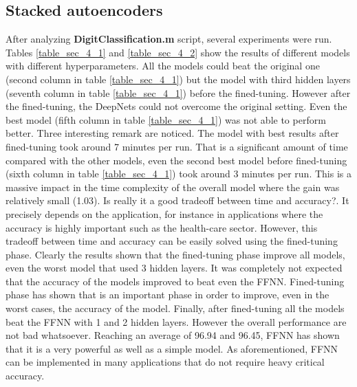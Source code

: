 \subsection{Stacked autoencoders}
After analyzing \textbf{DigitClassification.m} script, several experiments were run. Tables \ref{table_sec_4_1} and \ref{table_sec_4_2} show the results of different models with different hyperparameters.
\bigbreak
All the models could beat the original one (second column in table \ref{table_sec_4_1}) but the model with third hidden layers (seventh column in table \ref{table_sec_4_1}) before the fined-tuning. However after the fined-tuning, the DeepNets could not overcome the original setting. Even the best model (fifth column in table \ref{table_sec_4_1}) was not able to perform better.
\bigbreak
Three interesting remark are noticed. The model with best results after fined-tuning took around 7 minutes per run. That is a significant amount of time compared with the other models, even the second best model before fined-tuning (sixth column in table \ref{table_sec_4_1}) took around 3 minutes per run. This is a massive impact in the time complexity of the overall model where the gain was relatively small (1.03). Is really it a good tradeoff between time and accuracy?. It precisely depends on the application, for instance in applications where the accuracy is highly important such as the health-care sector.
\bigbreak
However, this tradeoff between time and accuracy can be easily solved using the fined-tuning phase. Clearly the results shown that the fined-tuning phase improve all models, even the worst model that used 3 hidden layers. It was completely not expected that the accuracy of the models improved to beat even the FFNN. Fined-tuning phase has shown that is an important phase in order to improve, even in the worst cases, the accuracy of the model.
\bigbreak
Finally, after fined-tuning all the models beat the FFNN with 1 and 2 hidden layers. However the overall performance are not bad whatsoever. Reaching an average of 96.94 and 96.45, FFNN has shown that it is a very powerful as well as a simple model. As aforementioned, FFNN can be implemented in many applications that do not require heavy critical accuracy.
